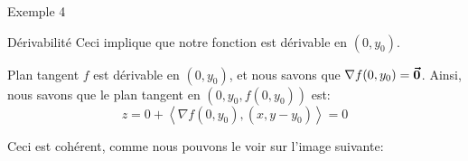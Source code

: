 \documentclass[a4paper]{article}
\begin{document}
\begin{parag}{Exemple 4}
\begin{subparag}{Dérivabilité}
        Ceci implique que notre fonction est dérivable en $\left(0, y_0\right)$.
    \end{subparag}

    \begin{subparag}{Plan tangent}
        $f$ est dérivable en $\left(0, y_0\right)$, et nous savons que $\nabla f\left(0, y_0\right) = \bvec{0}$. Ainsi, nous savons que le plan tangent en $\left(0, y_0, f\left(0, y_0\right)\right)$ est:
        \[z = 0 + \left<\nabla f\left(0, y_0\right), \left(x, y - y_0\right)\right> = 0\]

        Ceci est cohérent, comme nous pouvons le voir sur l'image suivante:
    \end{subparag}
\end{parag}
\end{document}
